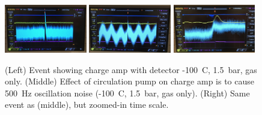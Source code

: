  \begin{figure}[htbp]
\begin{center}
\includegraphics[width = 0.32\textwidth, keepaspectratio]{figures/testbed/circ_off.png}
\includegraphics[width = 0.32\textwidth, keepaspectratio]{figures/testbed/circ_noise.png}
\includegraphics[width = 0.32\textwidth, keepaspectratio]{figures/testbed/circ_noise_zoom.png}
\caption{(Left) Event showing charge amp with detector -100~C, 1.5~bar, gas only. (Middle) Effect of circulation pump on charge amp is to cause 500~Hz oscillation noise (-100~C, 1.5~bar, gas only). (Right) Same event as (middle), but zoomed-in time scale.}
\label{fig:amp_noise}
\end{center}
\end{figure}

